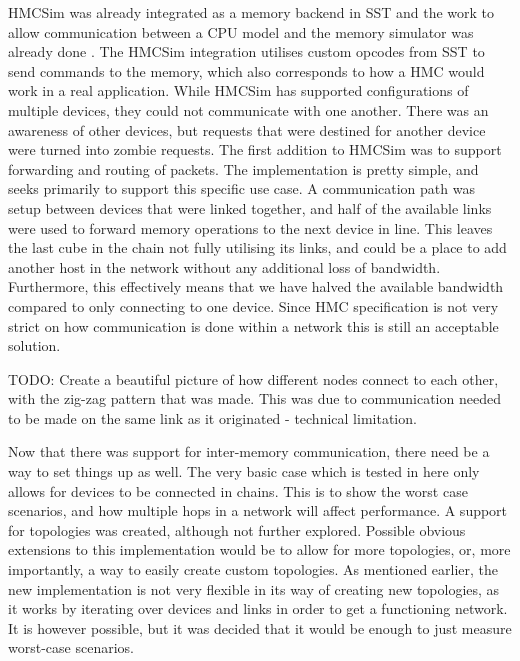 HMCSim was already integrated as a memory backend in SST and the work to allow communication between a CPU model and the memory simulator was already done \cite{voskuilen2018sst}. The HMCSim integration utilises custom opcodes from SST to send commands to the memory, which also corresponds to how a HMC would work in a real application. While HMCSim has supported configurations of multiple devices, they could not communicate with one another. There was an awareness of other devices, but requests that were destined for another device were turned into zombie requests. The first addition to HMCSim was to support forwarding and routing of packets. The implementation is pretty simple, and seeks primarily to support this specific use case. A communication path was setup between devices that were linked together, and half of the available links were used to forward memory operations to the next device in line. This leaves the last cube in the chain not fully utilising its links, and could be a place to add another host in the network without any additional loss of bandwidth. Furthermore, this effectively means that we have halved the available bandwidth compared to only connecting to one device. Since HMC specification is not very strict on how communication is done within a network this is still an acceptable solution.
\bigskip

TODO: Create a beautiful picture of how different nodes connect to each other, with the zig-zag pattern that was made. This was due to communication needed to be made on the same link as it originated - technical limitation.
\bigskip

Now that there was support for inter-memory communication, there need be a way to set things up as well. The very basic case which is tested in here only allows for devices to be connected in chains. This is to show the worst case scenarios, and how multiple hops in a network will affect performance. A support for topologies was created, although not further explored. Possible obvious extensions to this implementation would be to allow for more topologies, or, more importantly, a way to easily create custom topologies. As mentioned earlier, the new implementation is not very flexible in its way of creating new topologies, as it works by iterating over devices and links in order to get a functioning network. It is however possible, but it was decided that it would be enough to just measure worst-case scenarios.
\bigskip

